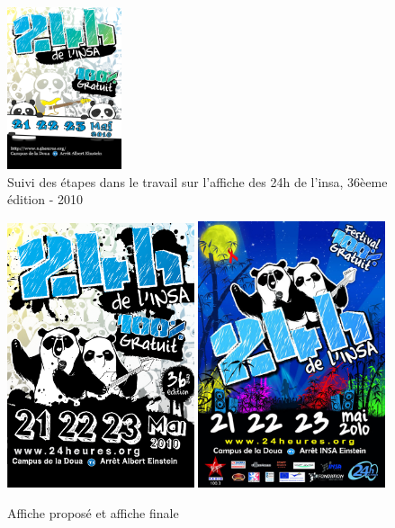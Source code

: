 \begin{figure}[h!]
                \includegraphics[width=0.3\textwidth]{img/preAffiche_panda_3-3.png}
                \caption{Suivi des étapes dans le travail sur l'affiche des 24h de l'insa, 36èeme édition - 2010}
            \end{figure}    
            
            \begin{figure}[h!]
                \centering  
                \includegraphics[width=0.49\textwidth]{img/affiche_concert.png}
                \includegraphics[width=0.49\textwidth]{img/affiche-concerts-v4-flat2.jpg}
                \caption{Affiche proposé et affiche finale}
            \end{figure}  
                    
